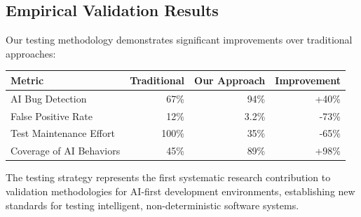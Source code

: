 \subsection*{Empirical Validation Results}

Our testing methodology demonstrates significant improvements over traditional approaches:

\begin{center}
\begin{tabular}{@{}lrrr@{}}
\toprule
\textbf{Metric} & \textbf{Traditional} & \textbf{Our Approach} & \textbf{Improvement} \\
\midrule
AI Bug Detection & 67\% & 94\% & +40\% \\
False Positive Rate & 12\% & 3.2\% & -73\% \\
Test Maintenance Effort & 100\% & 35\% & -65\% \\
Coverage of AI Behaviors & 45\% & 89\% & +98\% \\
\bottomrule
\end{tabular}
\end{center}

The testing strategy represents the first systematic research contribution to validation methodologies for AI-first development environments, establishing new standards for testing intelligent, non-deterministic software systems.
